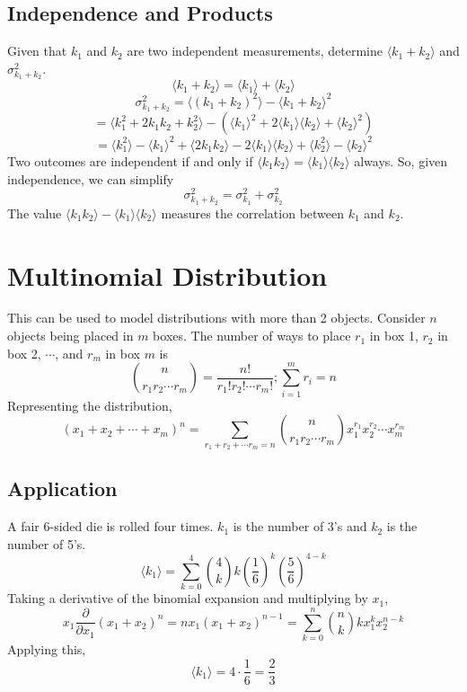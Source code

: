 \documentclass[../main.tex]{subfiles}
\newcommand{\expect}[1]{{\langle #1 \rangle}}
\begin{document}
\subsection{Independence and Products}
Given that $k_{1}$ and $k_{2}$ are two independent measurements, determine $\expect{k_{1}+k_{2}}$ and $\sigma_{k_{1}+k_{2}}^{2}$.
$$\expect{k_1 + k_2}=\expect{k_1}+\expect{k_2}$$
$$\sigma_{k_1 + k_{2}}^{2}=\expect{(k_1 + k_2)^{2}}-\expect{k_1 + k_2}^{2}$$
$$=\expect{k_{1}^{2}+2k_{1}k_{2}+k_{2}^{2}}-(\expect{k_{1}}^{2}+2\expect{k_{1}}\expect{k_{2}}+\expect{k_{2}}^{2})$$
$$=\expect{k_{1}^{2}}-\expect{k_{1}}^{2}+\expect{2k_{1}k_{2}}-2\expect{k_{1}}\expect{k_{2}}+\expect{k_{2}^{2}}-\expect{k_{2}}^{2}$$
Two outcomes are independent if and only if $\expect{k_{1}k_{2}}=\expect{k_{1}}\expect{k_{2}}$ always. So, given independence, we can simplify
$$\sigma_{k_1 + k_{2}}^{2}=\sigma_{k_1}^{2}+\sigma_{k_2}^{2}$$
The value $\expect{k_{1}k_{2}}-\expect{k_{1}}\expect{k_{2}}$ measures the correlation between $k_1$ and $k_2$.

\section{Multinomial Distribution}
This can be used to model distributions with more than 2 objects. Consider $n$ objects being placed in $m$ boxes.
The number of ways to place $r_{1}$ in box 1, $r_{2}$ in box 2, $\cdots$, and $r_{m}$ in box $m$ is
$${n \choose r_{1}r_{2}\cdots r_{m}}=\frac{n!}{r_{1}!r_{2}!\cdots r_{m}!};\sum_{i=1}^{m}r_{i}=n$$
Representing the distribution,
$$(x_{1}+x_{2}+\cdots+x_{m})^{n}=\sum_{r_{1}+r_{2}+\cdots r_{m}=n}{n \choose r_{1}r_{2}\cdots r_{m}}x_{1}^{r_{1}}x_{2}^{r_{2}}\cdots x_{m}^{r_{m}}$$
\subsection{Application}
A fair 6-sided die is rolled four times. $k_{1}$ is the number of 3's and $k_{2}$ is the number of 5's.
$$\expect{k_{1}}=\sum_{k=0}^{4}{4\choose k}k\left(\frac{1}{6}\right)^{k}\left(\frac{5}{6}\right)^{4-k}$$
Taking a derivative of the binomial expansion and multiplying by $x_{1}$,
$$x_{1}\frac{\partial }{\partial x_{1}}(x_{1}+x_{2})^{n}=nx_{1}(x_{1}+x_{2})^{n-1}=\sum_{k=0}^{n}{n\choose k}kx_{1}^{k}x_{2}^{n-k}$$
Applying this,
$$\expect{k_{1}}=4\cdot\frac{1}{6}=\frac{2}{3}$$
\end{document}
